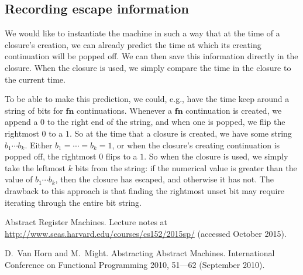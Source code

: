 \RequirePackage[hyphens]{url}\documentclass[12pt,oneside]{amsart}
\newcommand{\kw}[1]{\mathbf{#1}}
\begin{document}
\subsection{Recording escape information}

We would like to instantiate the machine in such a way that at the time of a closure's creation, we can already predict the time at which its creating continuation will be popped off.  We can then save this information directly in the closure.  When the closure is used, we simply compare the time in the closure to the current time.

To be able to make this prediction, we could, e.g., have the time keep around a string of bits for $\kw{fn}$ continuations.  Whenever a $\kw{fn}$ continuation is created, we append a $0$ to the right end of the string, and when one is popped, we flip the rightmost $0$ to a $1$.  So at the time that a closure is created, we have some string $b_1\cdots b_k$.  Either $b_1 = \cdots = b_k = 1$, or when the closure's creating continuation is popped off, the rightmost $0$ flips to a $1$.  So when the closure is used, we simply take the leftmost $k$ bits from the string: if the numerical value is greater than the value of $b_1\cdots b_k$, then the closure has escaped, and otherwise it has not.  The drawback to this approach is that finding the rightmost unset bit may require iterating through the entire bit string.

\begin{thebibliography}{99}

 Abstract Register Machines. Lecture notes at \url{http://www.seas.harvard.edu/courses/cs152/2015sp/} (accessed October 2015).

 D.~Van Horn and M.~Might. Abstracting Abstract Machines. International Conference on Functional Programming 2010, 51---62 (September 2010).

\end{thebibliography}
\end{document}
